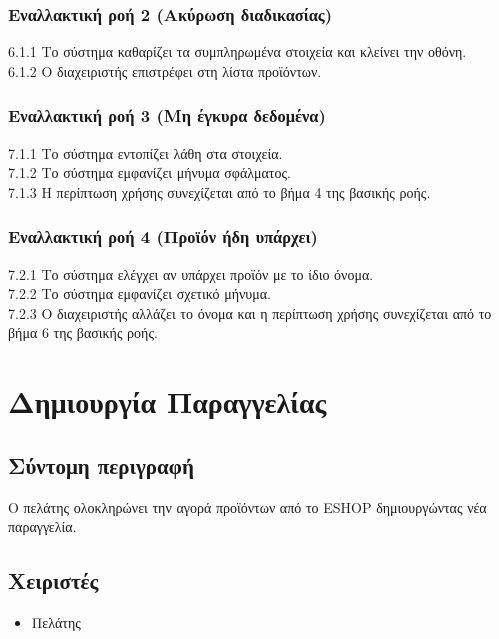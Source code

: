 \documentclass[12pt,a4paper,twoside]{book}
\begin{document}
\subsubsection*{Εναλλακτική ροή 2 (Ακύρωση διαδικασίας)}
6.1.1 Το σύστημα καθαρίζει τα συμπληρωμένα στοιχεία και κλείνει την οθόνη.\\
\hspace*{\parindent}6.1.2 Ο διαχειριστής επιστρέφει στη λίστα προϊόντων.

\subsubsection*{Εναλλακτική ροή 3 (Μη έγκυρα δεδομένα)}
7.1.1 Το σύστημα εντοπίζει λάθη στα στοιχεία.\\
\hspace*{\parindent}7.1.2 Το σύστημα εμφανίζει μήνυμα σφάλματος.\\
\hspace*{\parindent}7.1.3 Η περίπτωση χρήσης συνεχίζεται από το βήμα 4 της βασικής ροής.

\subsubsection*{Εναλλακτική ροή 4 (Προϊόν ήδη υπάρχει)}
7.2.1 Το σύστημα ελέγχει αν υπάρχει προϊόν με το ίδιο όνομα.\\
\hspace*{\parindent}7.2.2 Το σύστημα εμφανίζει σχετικό μήνυμα.\\
\hspace*{\parindent}7.2.3 Ο διαχειριστής αλλάζει το όνομα και η περίπτωση χρήσης συνεχίζεται από το βήμα 6 της βασικής ροής.

\section{Δημιουργία Παραγγελίας}

\subsection{Σύντομη περιγραφή}
Ο πελάτης ολοκληρώνει την αγορά προϊόντων από το ESHOP δημιουργώντας νέα παραγγελία.

\subsection{Χειριστές}
\begin{itemize}
    \item Πελάτης
\end{itemize}
\end{document}
